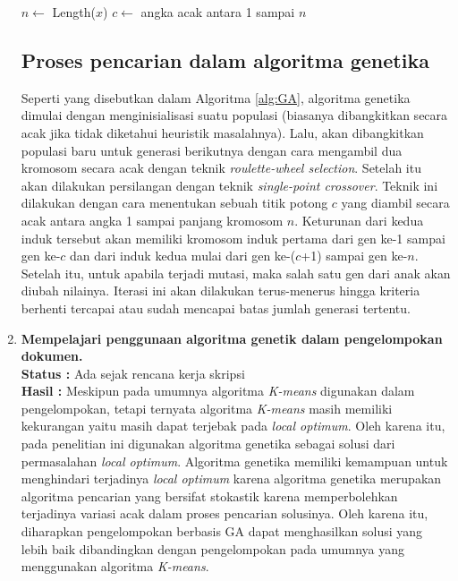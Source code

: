 \documentclass[a4paper,twoside]{article}
\begin{document}
\begin{enumerate}
\begin{algorithm}[h]
	\begin{algorithmic}[1]
		\STATE $n \leftarrow$ Length($x$)
		\STATE $c \leftarrow$ angka acak antara 1 sampai $n$
	\end{algorithmic}
	\hspace{5pt} 
\end{algorithm}

\subsection*{Proses pencarian dalam algoritma genetika}
Seperti yang disebutkan dalam Algoritma \ref{alg:GA}, algoritma genetika dimulai dengan menginisialisasi suatu populasi (biasanya dibangkitkan secara acak jika tidak diketahui heuristik masalahnya). Lalu, akan dibangkitkan populasi baru untuk generasi berikutnya dengan cara mengambil dua kromosom secara acak dengan teknik \textit{roulette-wheel selection}. Setelah itu akan dilakukan persilangan dengan teknik \textit{single-point crossover}. Teknik ini dilakukan dengan cara menentukan sebuah titik potong $c$ yang diambil secara acak antara angka 1 sampai panjang kromosom $n$. Keturunan dari kedua induk tersebut akan memiliki kromosom induk pertama dari gen ke-1 sampai gen ke-$c$ dan dari induk kedua mulai dari gen ke-($c$+1) sampai gen ke-$n$. Setelah itu, untuk apabila terjadi mutasi, maka salah satu gen dari anak akan diubah nilainya. Iterasi ini akan dilakukan terus-menerus hingga kriteria berhenti tercapai atau sudah mencapai batas jumlah generasi tertentu.
		
    	\item \textbf{Mempelajari penggunaan algoritma genetik dalam pengelompokan dokumen.}\\
    	{\bf Status :} Ada sejak rencana kerja skripsi\\
		{\bf Hasil :} Meskipun pada umumnya algoritma \textit{K-means} digunakan dalam pengelompokan, tetapi ternyata algoritma \textit{K-means} masih memiliki kekurangan yaitu masih dapat terjebak pada \textit{local optimum}. Oleh karena itu, pada penelitian ini digunakan algoritma genetika sebagai solusi dari permasalahan \textit{local optimum}. Algoritma genetika memiliki kemampuan untuk menghindari terjadinya \textit{local optimum} karena algoritma genetika merupakan algoritma pencarian yang bersifat stokastik karena memperbolehkan terjadinya variasi acak dalam proses pencarian solusinya. Oleh karena itu, diharapkan pengelompokan berbasis GA dapat menghasilkan solusi yang lebih baik dibandingkan dengan pengelompokan pada umumnya yang menggunakan algoritma \textit{K-means}.
		

\end{enumerate}
\end{document}
